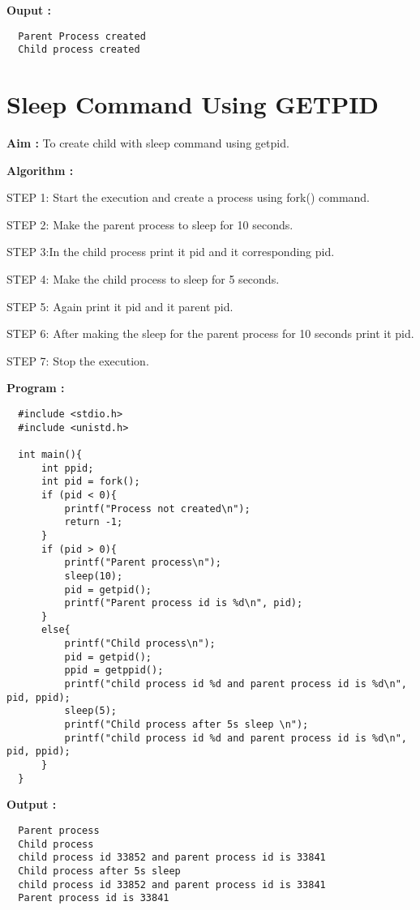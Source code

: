 \documentclass[journal,onecolumn]{IEEEtran}
\begin{document}
\textbf{Ouput :}
\begin{verbatim}
  Parent Process created
  Child process created
\end{verbatim}

\section{Sleep Command Using GETPID}
\textbf{Aim : } To create child with sleep command using getpid.

\textbf{Algorithm : }
\begin{list}{}{}
  \item STEP 1: Start the execution and create a process using fork() command.
  \item STEP 2: Make the parent process to sleep for 10 seconds.
  \item STEP 3:In the child process print it pid and it corresponding pid.
  \item STEP 4: Make the child process to sleep for 5 seconds.
  \item STEP 5: Again print it pid and it parent pid.
  \item STEP 6: After making the sleep for the parent process for 10 seconds print it
  pid.
  \item STEP 7: Stop the execution.
\end{list}

\textbf{Program : }
\begin{verbatim}
  #include <stdio.h>
  #include <unistd.h>
  
  int main(){
      int ppid;
      int pid = fork();
      if (pid < 0){
          printf("Process not created\n");
          return -1;
      }
      if (pid > 0){
          printf("Parent process\n");
          sleep(10);
          pid = getpid();
          printf("Parent process id is %d\n", pid);
      }
      else{
          printf("Child process\n");
          pid = getpid();
          ppid = getppid();
          printf("child process id %d and parent process id is %d\n", pid, ppid);
          sleep(5);
          printf("Child process after 5s sleep \n");
          printf("child process id %d and parent process id is %d\n", pid, ppid);
      }
  }
\end{verbatim}

\textbf{Output : }
\begin{verbatim}
  Parent process
  Child process
  child process id 33852 and parent process id is 33841
  Child process after 5s sleep 
  child process id 33852 and parent process id is 33841
  Parent process id is 33841
\end{verbatim}
\end{document}
